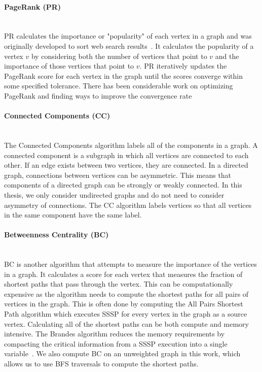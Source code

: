 \paragraph{PageRank (PR)}\mbox{}\\
PR calculates the importance or "popularity" of each vertex in a graph and was originally developed to sort web search results~\cite{page1999pagerank}.
It calculates the popularity of a vertex $v$ by considering both the number of vertices that point to $v$ and the importance of those vertices that point to $v$.
PR iteratively updates the PageRank score for each vertex in the graph until the scores converge within some specified tolerance.
There has been considerable work on optimizing PageRank and finding ways to improve the convergence rate~\cite{low2010graphlab,shun2013ligra,kohlschutter2006efficient,berkhin2005survey}

\paragraph{Connected Components (CC)}\mbox{}\\
The Connected Components algorithm labels all of the components in a graph. 
A connected component is a subgraph in which all vertices are connected to each other.
If an edge exists between two vertices, they are connected. 
In a directed graph, connections between vertices can be asymmetric.
This means that components of a directed graph can be strongly or weakly connected. 
In this thesis, we only consider undirected graphs and do not need to consider asymmetry of connections.
The CC algorithm labels vertices so that all vertices in the same component have the same label.

\paragraph{Betweenness Centrality (BC)}\mbox{}\\
BC is another algorithm that attempts to measure the importance of the vertices in a graph. 
It calculates a score for each vertex that measures the fraction of shortest paths that pass through the vertex.
This can be computationally expensive as the algorithm needs to compute the shortest paths for all pairs of vertices in the graph.
This is often done by computing the All Pairs Shortest Path algorithm which executes SSSP for every vertex in the graph as a source vertex. 
Calculating all of the shortest paths can be both compute and memory intensive. 
The Brandes algorithm reduces the memory requirements by compacting the critical information from a SSSP execution into a single variable~\cite{brandes2001faster}.
We also compute BC on an unweighted graph in this work, which allows us to use BFS traversals to compute the shortest paths. 
